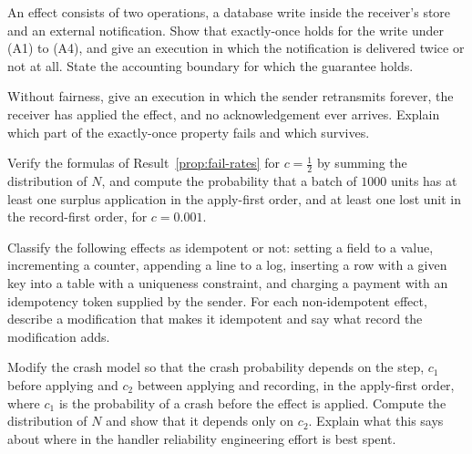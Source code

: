 \begin{exercise}
An effect consists of two operations, a database write inside the receiver's store and an external notification. Show that exactly-once holds for the write under (A1) to (A4), and give an execution in which the notification is delivered twice or not at all. State the accounting boundary for which the guarantee holds.
\end{exercise}

\begin{exercise}
Without fairness, give an execution in which the sender retransmits forever, the receiver has applied the effect, and no acknowledgement ever arrives. Explain which part of the exactly-once property fails and which survives.
\end{exercise}


\begin{exercise}
Verify the formulas of Result~\ref{prop:fail-rates} for $c=\tfrac12$ by summing the distribution of $N$, and compute the probability that a batch of $1000$ units has at least one surplus application in the apply-first order, and at least one lost unit in the record-first order, for $c=0.001$.\label{ex:fail-batch}
\end{exercise}

\begin{exercise}
Classify the following effects as idempotent or not: setting a field to a value, incrementing a counter, appending a line to a log, inserting a row with a given key into a table with a uniqueness constraint, and charging a payment with an idempotency token supplied by the sender. For each non-idempotent effect, describe a modification that makes it idempotent and say what record the modification adds.
\end{exercise}

\begin{exercise}
Modify the crash model so that the crash probability depends on the step, $c_1$ before applying and $c_2$ between applying and recording, in the apply-first order, where $c_1$ is the probability of a crash before the effect is applied. Compute the distribution of $N$ and show that it depends only on $c_2$. Explain what this says about where in the handler reliability engineering effort is best spent.\label{ex:two-crash}
\end{exercise}

